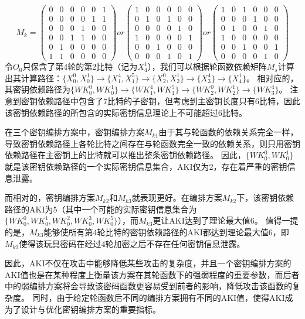 $$M_k=\left(
    \begin{array}{cccccc}
        0&0&0&0&0&1\\
        0&0&0&0&1&1\\
        0&0&0&1&0&0\\
        0&0&1&1&0&0\\
        0&1&0&0&0&0\\
        1&1&0&0&0&0
    \end{array}
\right)
or\left(
    \begin{array}{cccccc}
        1&0&0&0&0&0\\
        0&1&0&1&0&0\\
        0&0&0&0&1&0\\
        1&0&0&0&0&1\\
        0&0&1&0&0&0\\
        0&0&0&1&0&1
    \end{array}
\right)
or\left(
    \begin{array}{cccccc}
        1&0&1&0&0&0\\
        0&0&0&1&0&0\\
        0&1&0&0&1&0\\
        1&0&0&0&0&0\\
        0&0&1&0&0&1\\
        0&0&0&0&1&0
    \end{array}
\right)$$
令$O_0$只保含了第4轮的第2比特（记为$X_4^1$），我们可以根据轮函数依赖矩阵$M_s$计算出其计算路径：$\{X_0^0,X_0^1\}\rightarrow \{X_1^4,X_1^5\}\rightarrow \{X_2^0,X_2^1\}\rightarrow \{X_3^4\}\rightarrow \{X_4^1\}$。
相对应的，其密钥依赖路径为$\{WK_0^0,WK_0^1\}\rightarrow \{WK_1^4,WK_1^5\}\rightarrow \{WK_2^0,WK_2^1\}\rightarrow \{WK_3^4\}$。
注意到密钥依赖路径中包含了7比特的子密钥，但考虑到主密钥长度只有6比特，因此该密钥依赖路径的所包含的实际密钥信息理论上不可能超过6比特。

在三个密钥编排方案中，密钥编排方案$M_{k1}$由于其与轮函数的依赖关系完全一样，导致密钥依赖路径上各轮比特之间存在与轮函数完全一致的依赖关系，则只用密钥依赖路径在主密钥上的比特就可以推出整条密钥依赖路径。
因此，$\{WK_0^0,WK_0^1\}$就是该密钥依赖路径的一个实际密钥信息集合，AKI仅为2，存在着严重的密钥信息泄露。

而相对的，密钥编排方案$M_{k2}$和$M_{k3}$就表现更好。在编排方案$M_{k2}$下，该密钥依赖路径的AKI为5（其中一个可能的实际密钥信息集合为$\{WK_0^0,WK_0^1,WK_0^2,WK_0^3,WK_0^5\}$），而$M_{k3}$更让AKI达到了理论最大值6。
值得一提的是，$M_{k3}$能够使所有第4轮比特的密钥依赖路径的AKI都达到理论最大值6，即$M_{k3}$使得该玩具密码在经过4轮加密之后不存在任何密钥信息泄露。

因此，AKI不仅在攻击中能够降低某些攻击的复杂度，并且一个密钥编排方案的AKI值也是在某种程度上衡量该方案在其轮函数下的强弱程度的重要参数，而后者中的弱编排方案将会导致该密码函数更容易受到前者的影响，降低攻击该函数的复杂度。
同时，由于给定轮函数后不同的编排方案拥有不同的AKI值，使得AKI成为了设计与优化密钥编排方案的重要指标。
